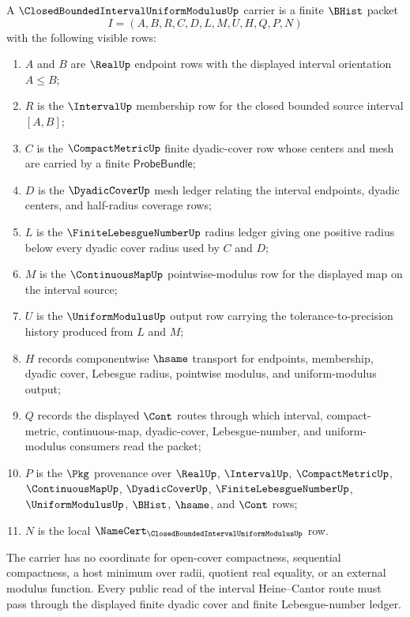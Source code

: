 \begin{definition}
\label{def:closed-bounded-interval-uniform-modulus-carrier}
A $\ClosedBoundedIntervalUniformModulusUp$ carrier is a finite $\BHist$ packet
$$
I=(A,B,R,C,D,L,M,U,H,Q,P,N)
$$
with the following visible rows:
\begin{enumerate}
\item $A$ and $B$ are $\RealUp$ endpoint rows with the displayed interval orientation $A \le B$;
\item $R$ is the $\IntervalUp$ membership row for the closed bounded source interval $[A,B]$;
\item $C$ is the $\CompactMetricUp$ finite dyadic-cover row whose centers and mesh are carried by a finite $\mathsf{ProbeBundle}$;
\item $D$ is the $\DyadicCoverUp$ mesh ledger relating the interval endpoints, dyadic centers, and half-radius coverage rows;
\item $L$ is the $\FiniteLebesgueNumberUp$ radius ledger giving one positive radius below every dyadic cover radius used by $C$ and $D$;
\item $M$ is the $\ContinuousMapUp$ pointwise-modulus row for the displayed map on the interval source;
\item $U$ is the $\UniformModulusUp$ output row carrying the tolerance-to-precision history produced from $L$ and $M$;
\item $H$ records componentwise $\hsame$ transport for endpoints, membership, dyadic cover, Lebesgue radius, pointwise modulus, and uniform-modulus output;
\item $Q$ records the displayed $\Cont$ routes through which interval, compact-metric, continuous-map, dyadic-cover, Lebesgue-number, and uniform-modulus consumers read the packet;
\item $P$ is the $\Pkg$ provenance over $\RealUp$, $\IntervalUp$, $\CompactMetricUp$, $\ContinuousMapUp$, $\DyadicCoverUp$, $\FiniteLebesgueNumberUp$, $\UniformModulusUp$, $\BHist$, $\hsame$, and $\Cont$ rows;
\item $N$ is the local $\NameCert_{\ClosedBoundedIntervalUniformModulusUp}$ row.
\end{enumerate}
The carrier has no coordinate for open-cover compactness, sequential compactness, a host minimum over radii, quotient real equality, or an external modulus function. Every public read of the interval Heine--Cantor route must pass through the displayed finite dyadic cover and finite Lebesgue-number ledger.
\end{definition}

